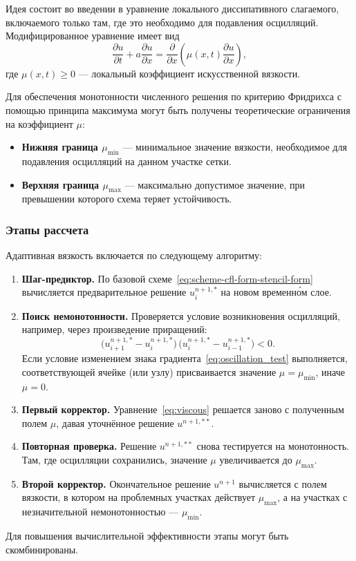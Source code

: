 \documentclass[12pt]{article}
\begin{document}
Идея состоит во введении в уравнение локального диссипативного слагаемого, включаемого только там, где это необходимо для подавления осцилляций. Модифицированное уравнение имеет вид
\begin{equation}
\frac{\partial u}{\partial t} + a \frac{\partial u}{\partial x} 
= \frac{\partial}{\partial x}\left(\mu(x,t) \frac{\partial u}{\partial x}\right),
\label{eq:viscous}
\end{equation}
где $\mu(x,t) \ge 0$ --- локальный коэффициент искусственной вязкости.

Для обеспечения монотонности численного решения по критерию Фридрихса с помощью принципа максимума могут быть получены теоретические ограничения на коэффициент $\mu$:
\begin{itemize}
\item \textbf{Нижняя граница $\mu_{\min}$} --- минимальное значение вязкости, необходимое для подавления осцилляций на данном участке сетки.
\item \textbf{Верхняя граница $\mu_{\max}$} --- максимально допустимое значение, при превышении которого схема теряет устойчивость.
\end{itemize}

\subsubsection{Этапы рассчета}
Адаптивная вязкость включается по следующему алгоритму:
\begin{enumerate}
\item \textbf{Шаг-предиктор.} По базовой схеме~\eqref{eq:scheme-cfl-form-stencil-form} вычисляется предварительное решение $u^{n+1,*}_i$ на новом временн\'{о}м слое.
\item \textbf{Поиск немонотонности.} Проверяется условие возникновения осцилляций, например, через произведение приращений:
\begin{equation}
\bigl(u_{i+1}^{n+1,*} - u_i^{n+1,*}\bigr) \,
\bigl(u_i^{n+1,*} - u_{i-1}^{n+1,*}\bigr) < 0.
\label{eq:oscillation_test}
\end{equation}
Если условие изменением знака градиента~\eqref{eq:oscillation_test} выполняется, соответствующей ячейке (или узлу) присваивается значение $\mu = \mu_{\min}$, иначе $\mu = 0$.
\item \textbf{Первый корректор.} Уравнение~\eqref{eq:viscous} решается заново с полученным полем $\mu$, давая уточнённое решение $u^{n+1,**}$.
\item \textbf{Повторная проверка.} Решение $u^{n+1,**}$ снова тестируется на монотонность. Там, где осцилляции сохранились, значение $\mu$ увеличивается до $\mu_{\max}$.
\item \textbf{Второй корректор.} Окончательное решение $u^{n+1}$ вычисляется с полем вязкости, в котором на проблемных участках действует $\mu_{\max}$, а на участках с незначительной немонотонностью --- $\mu_{\min}$.
\end{enumerate}
Для повышения вычислительной эффективности этапы могут быть скомбинированы.
\end{document}
